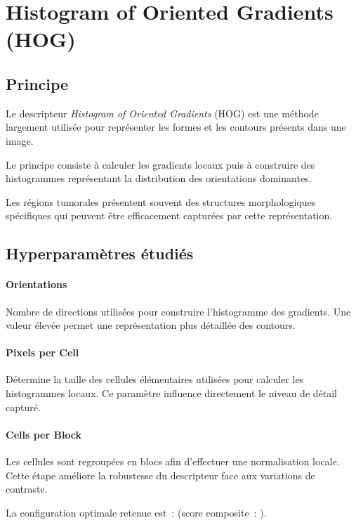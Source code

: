\section{Histogram of Oriented Gradients (HOG)}

\subsection{Principe}

Le descripteur \emph{Histogram of Oriented Gradients} (HOG) est une méthode largement utilisée
pour représenter les formes et les contours présents dans une image.

Le principe consiste à calculer les gradients locaux puis à construire des histogrammes
représentant la distribution des orientations dominantes.

Les régions tumorales présentent souvent des structures morphologiques spécifiques qui peuvent
être efficacement capturées par cette représentation.

\subsection{Hyperparamètres étudiés}

\paragraph{Orientations}
Nombre de directions utilisées pour construire l'histogramme des gradients. Une valeur élevée
permet une représentation plus détaillée des contours.

\paragraph{Pixels per Cell}
Détermine la taille des cellules élémentaires utilisées pour calculer les histogrammes locaux.
Ce paramètre influence directement le niveau de détail capturé.

\paragraph{Cells per Block}
Les cellules sont regroupées en blocs afin d'effectuer une normalisation locale. Cette étape
améliore la robustesse du descripteur face aux variations de contraste.

La configuration optimale retenue est~: \hogParams{} (score composite~: \hogScore).

